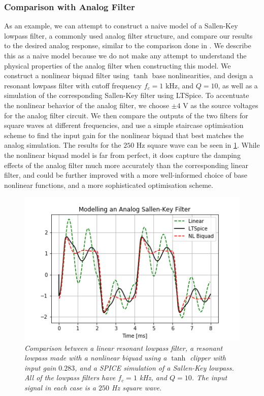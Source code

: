 \documentclass[twoside,a4paper]{article}
\begin{document}
\subsubsection{Comparison with Analog Filter}

As an example, we can attempt to construct a naive model of a Sallen-Key
lowpass filter, a commonly used analog filter structure, and compare
our results to the desired analog response, similar to the
comparison done in \cite{SKF}. We describe this
as a naive model because we do not make any attempt to understand the physical
properties of the analog filter when constructing this model. We construct
a nonlinear biquad filter using $\tanh$ base nonlinearities, and design a
resonant lowpass filter with cutoff frequency $f_c = 1 \text{ kHz}$,
and $Q=10$, as well as a simulation of the corresponding Sallen-Key
filter using LTSpice. To accentuate the nonlinear behavior of the analog
filter, we choose $\pm 4 \text{ V}$ as the source voltages for the analog
filter circuit.
\newline\newline
We then compare the outputs of the two filters
for square waves at different frequencies, and use a simple staircase
optimisation scheme to find the input gain for the nonlinear biquad
that best matches the analog simulation. The results for the $250 \text{ Hz}$
square wave can be seen in \cref{SPICE}. While the nonlinear biquad model
is far from perfect, it does capture the damping effects of the analog filter
much more accurately than the corresponding linear filter, and could be
further improved with a more well-informed choice of base nonlinear
functions, and a more sophisticated optimisation scheme.
%
\begin{figure}[ht]
    \center
    \includegraphics[width=\linewidth]{../Pics/Spice-Compare.png}
    \caption{\label{SPICE}{\it Comparison between a linear resonant lowpass
                            filter, a resonant lowpass made with a nonlinear biquad
                            using a $\tanh$ clipper with input gain $0.283$,
                            and a SPICE simulation of a Sallen-Key lowpass.
                            All of the lowpass filters have $f_c=1$ kHz, and
                            $Q=10$. The input signal in each case is a $250$ Hz
                            square wave.}}
\end{figure}
%
\end{document}
